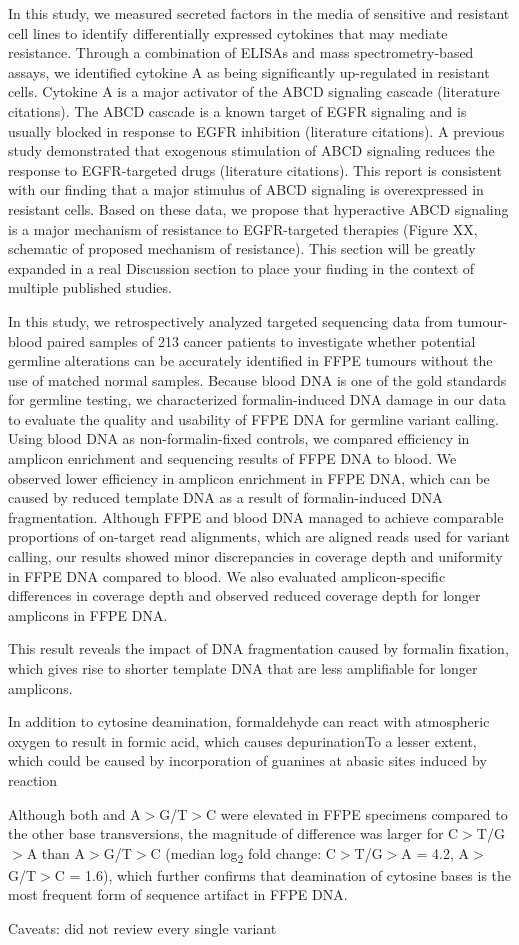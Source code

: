 In this study, we measured secreted factors in the media of sensitive and resistant cell lines to identify differentially expressed cytokines that may mediate resistance. Through a combination of ELISAs and mass spectrometry-based assays, we identified cytokine A as being significantly up-regulated in resistant cells. Cytokine A is a major activator of the ABCD signaling cascade (literature citations). The ABCD cascade is a known target of EGFR signaling and is usually blocked in response to EGFR inhibition (literature citations). A previous study demonstrated that exogenous stimulation of ABCD signaling reduces the response to EGFR-targeted drugs (literature citations). This report is consistent with our finding that a major stimulus of ABCD signaling is overexpressed in resistant cells. Based on these data, we propose that hyperactive ABCD signaling is a major mechanism of resistance to EGFR-targeted therapies (Figure XX, schematic of proposed mechanism of resistance). This section will be greatly expanded in a real Discussion section to place your finding in the context of multiple published studies.

In this study, we retrospectively analyzed targeted sequencing data from tumour-blood paired samples of 213 cancer patients to investigate whether potential germline alterations can be accurately identified in FFPE tumours without the use of matched normal samples. Because blood DNA is one of the gold standards for germline testing, we characterized formalin-induced DNA damage in our data to evaluate the quality and usability of FFPE DNA for germline variant calling. Using blood DNA as non-formalin-fixed controls, we compared efficiency in amplicon enrichment and sequencing results of FFPE DNA to blood. We observed lower efficiency in amplicon enrichment in FFPE DNA, which can be caused by reduced template DNA as a result of formalin-induced DNA fragmentation. Although FFPE and blood DNA managed to achieve comparable proportions of on-target read alignments, which are aligned reads used for variant calling, our results showed minor discrepancies in coverage depth and uniformity in FFPE DNA compared to blood. We also evaluated amplicon-specific differences in coverage depth and observed reduced coverage depth for longer amplicons in FFPE DNA.


This result reveals the impact of DNA fragmentation caused by formalin fixation, which gives rise to shorter template DNA that are less amplifiable for longer amplicons.

In addition to cytosine deamination, formaldehyde can react with atmospheric oxygen to result in formic acid, which causes depurinationTo a lesser extent, which could be caused by incorporation of guanines at abasic sites induced by reaction

Although both  and A$>$G/T$>$C were elevated in FFPE specimens compared to the other base transversions, the magnitude of difference was larger for C$>$T/G$>$A than A$>$G/T$>$C (median log\textsubscript{2} fold change: C$>$T/G$>$A = 4.2, A$>$G/T$>$C = 1.6), which further confirms that deamination of cytosine bases is the most frequent form of sequence artifact in FFPE DNA.


Caveats: did not review every single variant
